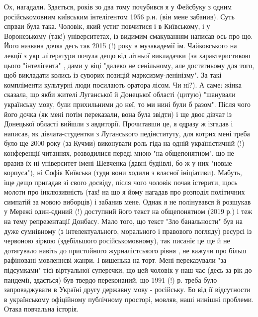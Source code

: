 \begin{itemize}
Ох, нагадали. Здається, років зо два тому почубився я у Фейсбуку з одним
російськомовним київським інтелігентом 1956 р.н. (він мене забанив). Суть
спрваи була така. Чоловік, який устиг повчитися і в Київському, і у
Воронезькому (так!) університетах, із видимим смакуванням написав ось про що.
Його названа дочка десь так 2015 (!) року в музакадемії ім. Чайковського на
лекції з укр .літератури почула дещо від літньої викладачки (за характеристикою
цього "інтелігента" , дами у віці "далеко не сенільному, але достатньому для
того, щоб викладати колись із суворих позицій марксизму-ленінізму". За такі
компліменти культурні люди посилають оратора лісом. Чи ні?). А саме: жінка
сказала, що якби жителі Луганської й Донецької області (цитую) "шанували
українську мову, були прихильними до неї, то ми нині були б разом". Після чого
його дочка (як мені потім переказали, вона була звідти) і ще двоє дівчат із
Донецької області вийшли з авдиторії. Прочитавши це, я одразу ж ізгадав і
написав, як дівчата-студентки з Луганського педінституту, для котрих мені треба
було ще 2000 року (за Кучми) виконувати роль гіда на одній україністичній (!)
конференції-читаннях, розводилися переді мною "на общепонятном", що не вразив
їх ні університет імені Шевченка (давні будіівлі, бо ж у них "новые корпуса"),
ні Софія Київська (туди вони ходили з власної ініціативи). Мабуть, іще дещо
пригадав зі свого досвіду, після чого чоловік почав істерити, щось молоти про
інклюзивність (так! на що я йому нагадав про розподіл політичних симпатій за
мовою виборців) і забанив мене. Однак я не полінувався й розшукав у Мережі
один-єдиний (!) доступний його текст на общепонятном (2019 р.) і теж на тему
репрезентації Донбасу. Мало того, що текст "Зло банальности" був на дуже
сумнівному (з інтелектуального, морального і правового погляду) ресурсі із
червоною зіркою (здебільшого російськомовному), так писаніє це ще й не
дотягувало навіть до пристойного журналістського рівня , не кажучи про більш
рафіновані мовленнєві жанри. І вишенька на торт. Мені переказували "за
підсумками" тієї віртуальної суперечки, що цей чоловік у наш час (десь за рік
до пандемії, здається) був твердо переконаний, що 1991 (!) р. треба було
запроваджувати в Україні другу державну мову - російську. Бо від її відсутности
в українському офіційному публічному просторі, мовляв, наші нинішні проблеми.
Отака повчальна історія.

 

\end{itemize}
